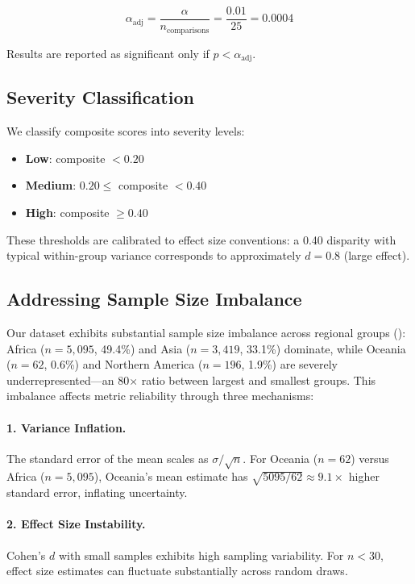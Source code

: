 \documentclass{article}
\begin{document}
\begin{equation}
\alpha_{\text{adj}} = \frac{\alpha}{n_{\text{comparisons}}} = \frac{0.01}{25} = 0.0004
\end{equation}

Results are reported as significant only if $p < \alpha_{\text{adj}}$.

\subsection{Severity Classification}

We classify composite scores into severity levels:

\begin{itemize}[nosep,leftmargin=*]
    \item \textbf{Low}: composite $< 0.20$
    \item \textbf{Medium}: $0.20 \leq$ composite $< 0.40$
    \item \textbf{High}: composite $\geq 0.40$
\end{itemize}

These thresholds are calibrated to effect size conventions: a 0.40 disparity with typical within-group variance corresponds to approximately $d = 0.8$ (large effect).

\subsection{Addressing Sample Size Imbalance}
\label{sec:imbalance}

Our dataset exhibits substantial sample size imbalance across regional groups (): Africa ($n=5{,}095$, 49.4\%) and Asia ($n=3{,}419$, 33.1\%) dominate, while Oceania ($n=62$, 0.6\%) and Northern America ($n=196$, 1.9\%) are severely underrepresented---an 80$\times$ ratio between largest and smallest groups. This imbalance affects metric reliability through three mechanisms:

\paragraph{1. Variance Inflation.} The standard error of the mean scales as $\sigma / \sqrt{n}$. For Oceania ($n=62$) versus Africa ($n=5{,}095$), Oceania's mean estimate has $\sqrt{5095/62} \approx 9.1\times$ higher standard error, inflating uncertainty.

\paragraph{2. Effect Size Instability.} Cohen's $d$ with small samples exhibits high sampling variability. For $n < 30$, effect size estimates can fluctuate substantially across random draws.
\end{document}
